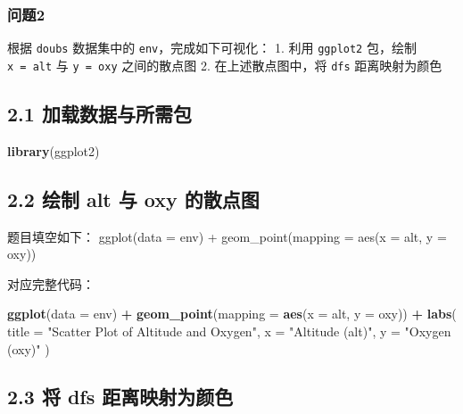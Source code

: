 \documentclass[
]{article}
\newenvironment{Shaded}{\begin{snugshade}}{\end{snugshade}}
\newcommand{\AttributeTok}[1]{\textcolor[rgb]{0.13,0.29,0.53}{#1}}
\newcommand{\FunctionTok}[1]{\textcolor[rgb]{0.13,0.29,0.53}{\textbf{#1}}}
\newcommand{\NormalTok}[1]{#1}
\newcommand{\SpecialCharTok}[1]{\textcolor[rgb]{0.81,0.36,0.00}{\textbf{#1}}}
\newcommand{\StringTok}[1]{\textcolor[rgb]{0.31,0.60,0.02}{#1}}
\begin{document}
\subsubsection{问题2}\label{ux95eeux98982}

根据 \texttt{doubs} 数据集中的 \texttt{env}，完成如下可视化： 1. 利用
\texttt{ggplot2} 包，绘制 \texttt{x\ =\ alt} 与 \texttt{y\ =\ oxy}
之间的散点图 2. 在上述散点图中，将 \texttt{dfs} 距离映射为颜色

\subsection{2.1
加载数据与所需包}\label{ux52a0ux8f7dux6570ux636eux4e0eux6240ux9700ux5305-1}

\begin{Shaded}
\begin{Highlighting}[]
\FunctionTok{library}\NormalTok{(ggplot2)}
\end{Highlighting}
\end{Shaded}

\subsection{2.2 绘制 alt 与 oxy
的散点图}\label{ux7ed8ux5236-alt-ux4e0e-oxy-ux7684ux6563ux70b9ux56fe}

题目填空如下： ggplot(data = env) + geom\_point(mapping = aes(x = alt, y
= oxy))

对应完整代码：

\begin{Shaded}
\begin{Highlighting}[]
\FunctionTok{ggplot}\NormalTok{(}\AttributeTok{data =}\NormalTok{ env) }\SpecialCharTok{+}
  \FunctionTok{geom\_point}\NormalTok{(}\AttributeTok{mapping =} \FunctionTok{aes}\NormalTok{(}\AttributeTok{x =}\NormalTok{ alt, }\AttributeTok{y =}\NormalTok{ oxy)) }\SpecialCharTok{+}
  \FunctionTok{labs}\NormalTok{(}
    \AttributeTok{title =} \StringTok{"Scatter Plot of Altitude and Oxygen"}\NormalTok{,}
    \AttributeTok{x =} \StringTok{"Altitude (alt)"}\NormalTok{,}
    \AttributeTok{y =} \StringTok{"Oxygen (oxy)"}
\NormalTok{  )}
\end{Highlighting}
\end{Shaded}

\subsection{2.3 将 dfs
距离映射为颜色}\label{ux5c06-dfs-ux8dddux79bbux6620ux5c04ux4e3aux989cux8272}
\end{document}
